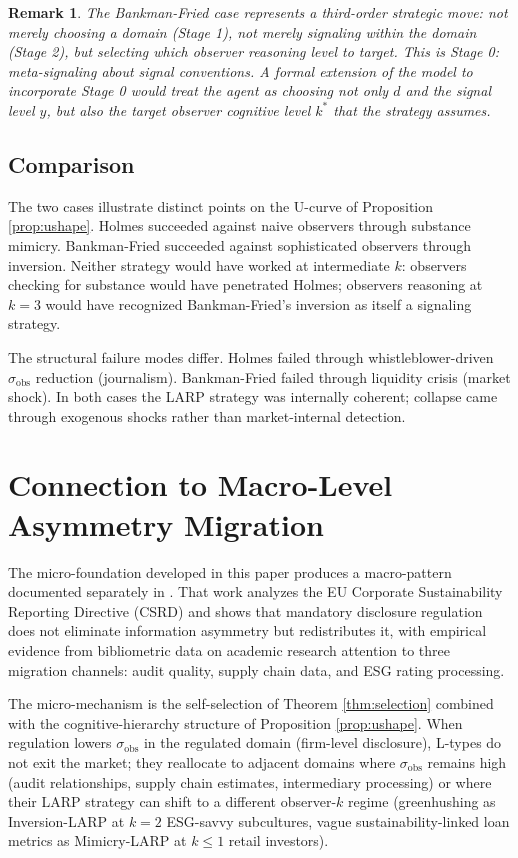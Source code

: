 \documentclass[11pt]{article}
\newtheorem{remark}{Remark}
\begin{document}
\begin{remark}
The Bankman-Fried case represents a third-order strategic move: not merely choosing a domain (Stage 1), not merely signaling within the domain (Stage 2), but selecting which observer reasoning level to target. This is Stage 0: meta-signaling about signal conventions. A formal extension of the model to incorporate Stage 0 would treat the agent as choosing not only $d$ and the signal level $y$, but also the target observer cognitive level $k^*$ that the strategy assumes.
\end{remark}

\subsection{Comparison}

The two cases illustrate distinct points on the U-curve of Proposition \ref{prop:ushape}. Holmes succeeded against naive observers through substance mimicry. Bankman-Fried succeeded against sophisticated observers through inversion. Neither strategy would have worked at intermediate $k$: observers checking for substance would have penetrated Holmes; observers reasoning at $k = 3$ would have recognized Bankman-Fried's inversion as itself a signaling strategy.

The structural failure modes differ. Holmes failed through whistleblower-driven $\sigma_{\mathrm{obs}}$ reduction (journalism). Bankman-Fried failed through liquidity crisis (market shock). In both cases the LARP strategy was internally coherent; collapse came through exogenous shocks rather than market-internal detection.

\section{Connection to Macro-Level Asymmetry Migration}

The micro-foundation developed in this paper produces a macro-pattern documented separately in \cite{vosteen2026waterbed}. That work analyzes the EU Corporate Sustainability Reporting Directive (CSRD) and shows that mandatory disclosure regulation does not eliminate information asymmetry but redistributes it, with empirical evidence from bibliometric data on academic research attention to three migration channels: audit quality, supply chain data, and ESG rating processing.

The micro-mechanism is the self-selection of Theorem \ref{thm:selection} combined with the cognitive-hierarchy structure of Proposition \ref{prop:ushape}. When regulation lowers $\sigma_{\mathrm{obs}}$ in the regulated domain (firm-level disclosure), L-types do not exit the market; they reallocate to adjacent domains where $\sigma_{\mathrm{obs}}$ remains high (audit relationships, supply chain estimates, intermediary processing) or where their LARP strategy can shift to a different observer-$k$ regime (greenhushing as Inversion-LARP at $k = 2$ ESG-savvy subcultures, vague sustainability-linked loan metrics as Mimicry-LARP at $k \leq 1$ retail investors).
\end{document}
